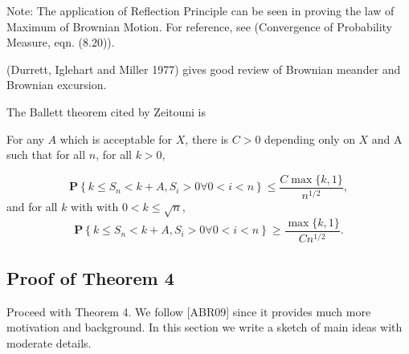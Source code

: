 
Note: The application of Reflection Principle can be seen in proving the law of Maximum of Brownian Motion. For reference, see (Convergence of Probability Measure, eqn. (8.20)).

(Durrett, Iglehart and Miller 1977) gives good review of Brownian meander and Brownian excursion.

The Ballett theorem cited by Zeitouni is
\begin{theorem}
    For any $A$ which is acceptable for $X$, there is $C>0$ depending only on $X$ and A such that for all $n$, for all $k>0$,

\[
\mathbf{P}\left\{k \leq S_n<k+A, S_i>0 \forall 0<i<n\right\} \leq \frac{C \max \{k, 1\}}{n^{1 / 2}},
\]
and for all $k$ with with $0<k \leq \sqrt{n}$,
\[
\mathbf{P}\left\{k \leq S_n<k+A, S_i>0 \forall 0<i<n\right\} \geq \frac{\max \{k, 1\}}{C n^{1 / 2}}.
\]
\end{theorem}




\subsection{Proof of Theorem 4}

Proceed with Theorem 4. %
We follow [ABR09] since it provides much more motivation and background. In this section we write a sketch of main ideas with moderate details. 

